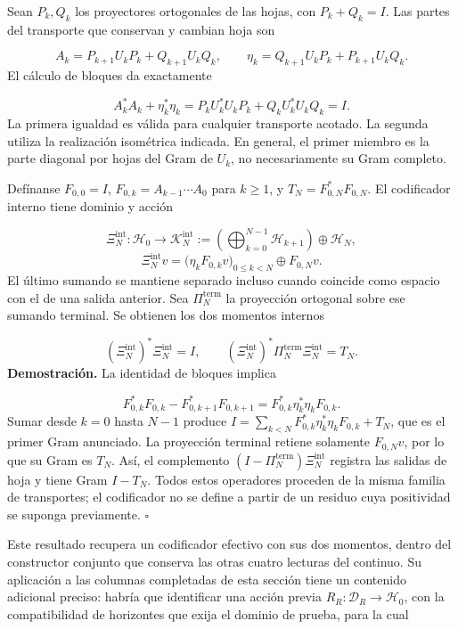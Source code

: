 Sean \(P_k,Q_k\) los proyectores ortogonales de las hojas, con \(P_k+Q_k=I\). Las partes del transporte que conservan y cambian hoja son

\[
A_k=P_{k+1}U_kP_k+Q_{k+1}U_kQ_k,
\qquad
\eta_k=Q_{k+1}U_kP_k+P_{k+1}U_kQ_k.
\]
El cálculo de bloques da exactamente

\[
A_k^*A_k+\eta_k^*\eta_k
=P_kU_k^*U_kP_k+Q_kU_k^*U_kQ_k=I.
\]
La primera igualdad es válida para cualquier transporte acotado. La segunda utiliza la realización isométrica indicada. En general, el primer miembro es la parte diagonal por hojas del Gram de \(U_k\), no necesariamente su Gram completo.

Defínanse \(F_{0,0}=I\), \(F_{0,k}=A_{k-1}\cdots A_0\) para \(k\geq1\), y \(T_N=F_{0,N}^*F_{0,N}\). El codificador interno tiene dominio y acción

\[
\Xi_N^{\mathrm{int}}:\mathscr H_0\longrightarrow
\mathscr K_N^{\mathrm{int}}
:=\left(\bigoplus_{k=0}^{N-1}\mathscr H_{k+1}\right)\oplus\mathscr H_N,
\]
\[
\Xi_N^{\mathrm{int}}v
=\bigl(\eta_kF_{0,k}v\bigr)_{0\leq k<N}\oplus F_{0,N}v.
\]
El último sumando se mantiene separado incluso cuando coincide como espacio con el de una salida anterior. Sea \(\Pi_N^{\mathrm{term}}\) la proyección ortogonal sobre ese sumando terminal. Se obtienen los dos momentos internos

\[
(\Xi_N^{\mathrm{int}})^*\Xi_N^{\mathrm{int}}=I,
\qquad
(\Xi_N^{\mathrm{int}})^*\Pi_N^{\mathrm{term}}\Xi_N^{\mathrm{int}}=T_N.
\]
\textbf{Demostración.} La identidad de bloques implica

\[
F_{0,k}^*F_{0,k}-F_{0,k+1}^*F_{0,k+1}
=F_{0,k}^*\eta_k^*\eta_kF_{0,k}.
\]
Sumar desde \(k=0\) hasta \(N-1\) produce \(I=\sum_{k<N}F_{0,k}^*\eta_k^*\eta_kF_{0,k}+T_N\), que es el primer Gram anunciado. La proyección terminal retiene solamente \(F_{0,N}v\), por lo que su Gram es \(T_N\). Así, el complemento \((I-\Pi_N^{\mathrm{term}})\Xi_N^{\mathrm{int}}\) registra las salidas de hoja y tiene Gram \(I-T_N\). Todos estos operadores proceden de la misma familia de transportes; el codificador no se define a partir de un residuo cuya positividad se suponga previamente. \hfill\(\square\)

Este resultado recupera un codificador efectivo con sus dos momentos, dentro del constructor conjunto que conserva las otras cuatro lecturas del continuo. Su aplicación a las columnas completadas de esta sección tiene un contenido adicional preciso: habría que identificar una acción previa \(R_R:\mathcal D_R\to\mathscr H_0\), con la compatibilidad de horizontes que exija el dominio de prueba, para la cual

